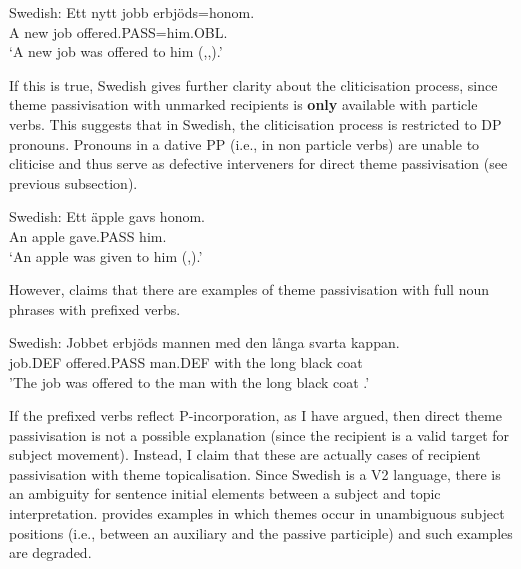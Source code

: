 \begin{exe}
	\ex Swedish:\label{ex:sw-offer-pass}
	\gll Ett nytt jobb erbjöds=honom.\\
A new job offered.PASS=him.OBL.\\
\trans `A new job was offered to him (\citealt{Anward.1989},\citealt{Falk.1990},\citealt{Lundquist.2006}).'
\end{exe}

If this is true, Swedish gives further clarity about the cliticisation process, since theme passivisation with unmarked recipients is \textbf{only} available with particle verbs. This suggests that in Swedish, the cliticisation process is restricted to DP pronouns. Pronouns in a dative PP (i.e., in non particle verbs) are unable to cliticise and thus serve as defective interveners for direct theme passivisation (see previous subsection).

\begin{exe}
	\ex Swedish:\label{ex:sw-give-pass}
	\gll *Ett äpple gavs honom.\\
	 An apple gave.PASS him.\\
	 \trans `An apple was given to him (\citealt{Anward.1989},\citealt{Lundquist.2006}).'
\end{exe}

However, \cite{Lundquist.2004} claims that there are examples of theme passivisation with full noun phrases with prefixed verbs.

\begin{exe}
	\ex Swedish:\label{ex:sw-offer-thepas}
	\gll Jobbet erbjöds mannen med den långa svarta kappan.\\
	job.DEF offered.PASS man.DEF with the long black coat\\
	'The job was offered to the man with the long black coat \citep[ex 26]{Lundquist.2004}.'
\end{exe}

If the prefixed verbs reflect P-incorporation, as I have argued, then direct theme passivisation is not a possible explanation (since the recipient is a valid target for subject movement). Instead, I claim that these are actually cases of recipient passivisation with theme topicalisation. Since Swedish is a V2 language, there is an ambiguity for sentence initial elements between a subject and topic interpretation. \cite{Lundquist.2004} provides examples in which themes occur in unambiguous subject positions (i.e., between an auxiliary and the passive participle) and such examples are degraded.

